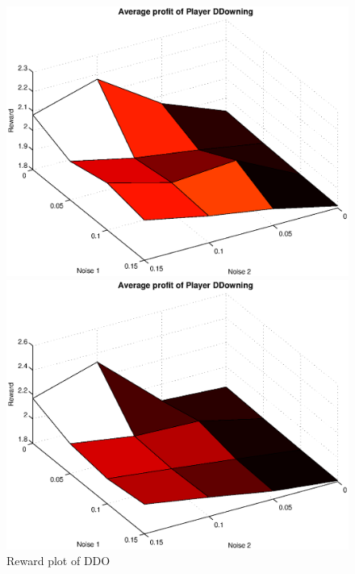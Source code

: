 \begin{figure}[h]
	\caption{Reward plot of DDO}
	\label{pic player dd}
\begin{minipage}[hbt]{0.65\textwidth}
	\centering
	\includegraphics[width=\textwidth]{pics/simulation1/Reward_vs_Noise_of_Player_DDowning}
\end{minipage}
\hfill
\begin{minipage}[hbt]{0.3\textwidth}
	\centering
	\includegraphics[width=\textwidth]{pics/simulation2/Reward_vs_Noise_of_Player_DDowning}
\end{minipage}

\end{figure}

